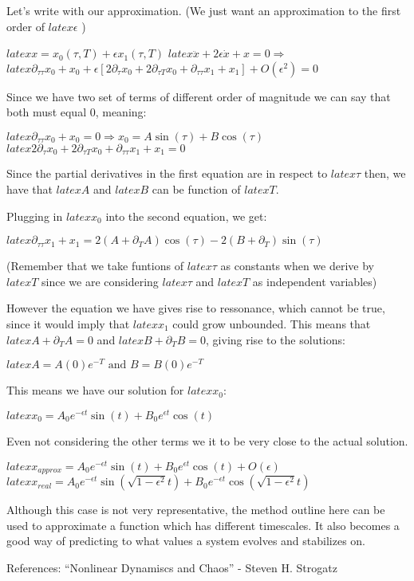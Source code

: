 Let's write with our approximation. (We just want an approximation to the first order of $latex \epsilon $ )

$latex x = x_0(\tau, T) + \epsilon x_1(\tau, T) $
$latex \ddot x + 2\epsilon \dot x + x = 0 \Rightarrow$
$latex  \partial_{\tau\tau}x_0 + x_0 + \epsilon[ 2\partial_\tau x_0 +2\partial_{\tau T} x_0 + \partial_{\tau\tau}x_1 + x_1] + O(\epsilon^2) = 0 $

Since we have two set of terms of different order of magnitude we can say that both must equal 0, meaning:

$latex \partial_{\tau\tau}x_0 + x_0 = 0 \Rightarrow x_0 = A\sin(\tau) + B\cos(\tau) $
$latex 2\partial_\tau x_0 +2\partial_{\tau T} x_0 + \partial_{\tau\tau}x_1 + x_1 = 0$

Since the partial derivatives in the first equation are in respect to $latex \tau $ then, we have that $latex A $ and $latex B $ can be function of $latex T $.

Plugging in $latex x_0 $ into the second equation, we get:

$latex \partial_{\tau\tau} x_1 + x_1 = 2(A + \partial_{T}A) \cos(\tau) - 2(B + \partial_{T}) \sin(\tau) $

(Remember that we take funtions of $latex \tau $ as constants when we derive by $latex T $ since we are considering $latex \tau $ and $latex T$ as independent variables)

However the equation we have gives rise to ressonance, which cannot be true, since it would imply that $latex x_1 $ could grow unbounded. This means that $latex A + \partial_T A  = 0 $ and  $latex B + \partial_T B  = 0 $, giving rise to the solutions:

$latex A = A(0)e^{-T} \text{ and } B = B(0)e^{-T} $

This means we have our solution for $latex x_0 $:

$latex x_0 = A_0e^{-\epsilon t}\sin(t) + B_0e^{\epsilon t}\cos(t)$

Even not considering the other terms we it to be very close to the actual solution.

$latex x_{approx} =  A_0e^{-\epsilon t}\sin(t) + B_0e^{\epsilon t}\cos(t) + O(\epsilon)$
$latex x_{real} = A_0e^{-\epsilon t} \sin( \sqrt{1-\epsilon^2} t) + B_0e^{-\epsilon t} \cos( \sqrt{1-\epsilon^2} t) $


Although this case is not very representative, the method outline here can be used to approximate a function which has different timescales. It also becomes a good way of predicting to what values a system evolves and stabilizes on.

References: ``Nonlinear Dynamiscs and Chaos'' - Steven H. Strogatz


